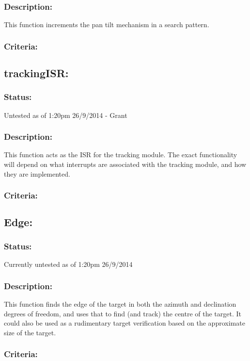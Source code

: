 \documentclass[]{article}
\begin{document}
\subsubsection{Description:}
This function increments the pan tilt mechanism in a search pattern.

\subsubsection{Criteria:}

\subsection{trackingISR:}
\subsubsection{Status:}
Untested as of 1:20pm 26/9/2014 - Grant

\subsubsection{Description:}
This function acts as the ISR for the tracking module. The exact functionality will depend on what interrupts are associated with the tracking module, and how they are implemented.

\subsubsection{Criteria:}


\subsection{Edge:}
\subsubsection{Status:}
Currently untested as of 1:20pm 26/9/2014

\subsubsection{Description:}
This function finds the edge of the target in both the azimuth and declination degrees of freedom, and uses that to find (and track) the centre of the target. It could also be used as a rudimentary target verification based on the approximate size of the target.

\subsubsection{Criteria:}
\end{document}
